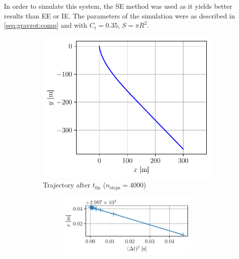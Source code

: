 In order to simulate this system, the SE method was used as it yields better results than EE or IE. The parameters of the simulation were as described in \ref{seq:gravrot:comp} and with $C_t = 0.35$, $S = \pi R^2$.

\begin{figure}[h]
    \centering
    \begin{subfigure}{0.49\linewidth}
        \centering
        \includegraphics[width=\linewidth]{figures/grav_frict_position.pdf}
        \caption{Trajectory after $t_\textrm{fin}$ ($n_\textrm{steps}=4000$)}
        \label{fig:gravfrict:pos}
    \end{subfigure}%
    \hspace*{0.2cm}
    \begin{subfigure}{0.45\linewidth}
        \begin{subfigure}{\linewidth}
            \centering
            \includegraphics[width=\linewidth]{figures/grav_frict_convergence_x.pdf}

\end{subfigure}
\end{subfigure}
\end{figure}
